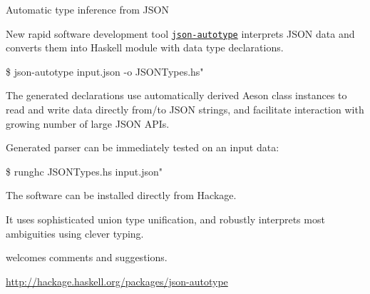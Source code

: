 \begin{hcarentry}[new]{Automatic type inference from JSON}
\label{jsonautotype}
\makeheader

New rapid software development tool \href{https://github.com/mgajda/json-autotype}{\texttt{json-autotype}} interprets JSON
data and converts them into Haskell module with data type declarations.

\begin{code}
\$ json-autotype input.json -o JSONTypes.hs"
\end{code}

The generated declarations use automatically derived Aeson class instances
to read and write data directly from/to JSON strings,
and facilitate interaction with growing number of large JSON APIs.

Generated parser can be immediately tested on an input data:

\begin{code}
\$ runghc JSONTypes.hs input.json"
\end{code}

The software can be installed directly from Hackage.

It uses sophisticated union type unification, and robustly
interprets most ambiguities using clever typing.

 welcomes comments and suggestions.

\FurtherReading
\begin{compactitem}
\item \url{http://hackage.haskell.org/packages/json-autotype}
\end{compactitem}
\end{hcarentry}

